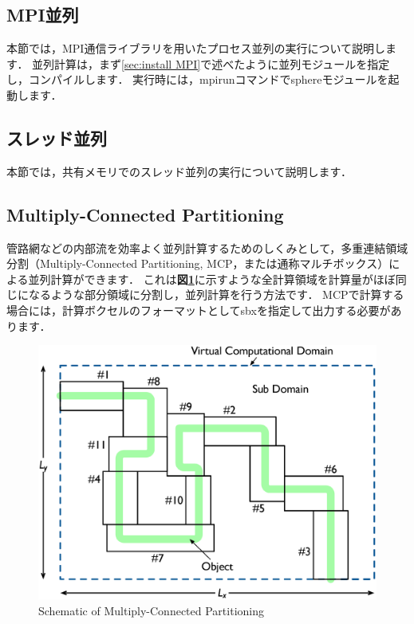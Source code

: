\subsection{MPI並列}
\label{sec:MPI}
本節では，MPI通信ライブラリを用いたプロセス並列の実行について説明します．
並列計算は，まず\ref{sec:install MPI}で述べたように並列モジュールを指定し，コンパイルします．
実行時には，mpirunコマンドでsphereモジュールを起動します．

{\small
{}
}

%
\pagebreak
\subsection{スレッド並列}
\label{sec:thread}
本節では，共有メモリでのスレッド並列の実行について説明します．

%
\pagebreak
\subsection{Multiply-Connected Partitioning}
\label{sec:multibox}
管路網などの内部流を効率よく並列計算するためのしくみとして，多重連結領域分割（Multiply-Connected Partitioning, MCP，または通称マルチボックス）による並列計算ができます．
これは\textbf{図\ref{fig:multibox}}に示すような全計算領域を計算量がほぼ同じになるような部分領域に分割し，並列計算を行う方法です．
MCPで計算する場合には，計算ボクセルのフォーマットとしてsbxを指定して出力する必要があります．

\begin{figure}[htbp]
\begin{center}
\includegraphics[width=12cm,clip]{mBox.eps}
\end{center}
\caption{Schematic of Multiply-Connected Partitioning}
\label{fig:multibox}
\end{figure}

